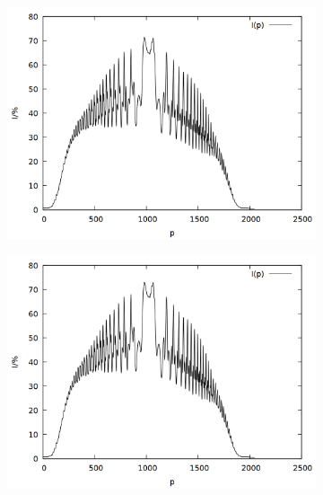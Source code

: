 \begin{figure}
\centering
\begin{subfigure}{0.45\textwidth}
\includegraphics[width=\textwidth]{data/zeeman/out_7_8_raw.png}
\end{subfigure}
\begin{subfigure}{0.45\textwidth}
\includegraphics[width=\textwidth]{data/zeeman/out_8_1_raw.png}
\end{subfigure}
\begin{subfigure}{0.45\textwidth}

\end{subfigure}
\end{figure}
